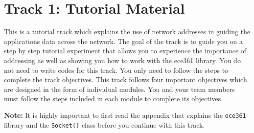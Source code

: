 \documentclass[11pt]{article}
\begin{document}
\section{Track 1: Tutorial Material}
\label{sec:track1}
This is a tutorial track which explains the use of network addresses in guiding the applications data across the network. The goal of the track is to guide you on a step by step tutorial experiment that allows you to experience the importance of addressing as well as showing you how to work with the ece361 library. You do not need to write codes for this track. You only need to follow the steps to complete the track objectives. This track follows four important objectives which are designed in the form of individual modules. You and your team members must follow the steps included in each module to complete its objectives.

\textbf{Note:}
It is highly important to first read the appendix that explains the \texttt{ece361} library and the \texttt{Socket()} class before you continue with this track.

\end{document}
